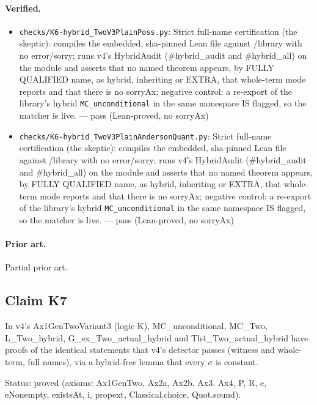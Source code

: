 \documentclass{article}
\begin{document}
\paragraph{Verified.}
\begin{itemize}
\item \texttt{checks/K6-hybrid\_TwoV3PlainPoss.py}: Strict full-name certification (the skeptic): compiles the embedded, sha-pinned Lean file against /library with no error/sorry; runs v4's HybridAudit (\#hybrid\_audit and \#hybrid\_all) on the module and asserts that no named theorem appears, by FULLY QUALIFIED name, as hybrid, inheriting or EXTRA, that whole-term mode reports and that there is no sorryAx; negative control: a re-export of the library's hybrid \texttt{MC\_unconditional} in the same namespace IS flagged, so the matcher is live. --- pass (Lean-proved, no sorryAx)
\item \texttt{checks/K6-hybrid\_TwoV3PlainAndersonQuant.py}: Strict full-name certification (the skeptic): compiles the embedded, sha-pinned Lean file against /library with no error/sorry; runs v4's HybridAudit (\#hybrid\_audit and \#hybrid\_all) on the module and asserts that no named theorem appears, by FULLY QUALIFIED name, as hybrid, inheriting or EXTRA, that whole-term mode reports and that there is no sorryAx; negative control: a re-export of the library's hybrid \texttt{MC\_unconditional} in the same namespace IS flagged, so the matcher is live. --- pass (Lean-proved, no sorryAx)
\end{itemize}

\paragraph{Prior art.} Partial prior art.

\subsection*{Claim K7}

In v4's Ax1GenTwoVariant3 (logic K), MC\_unconditional, MC\_Two, L\_Two\_hybrid, G\_ex\_Two\_actual\_hybrid and Th4\_Two\_actual\_hybrid have proofs of the identical statements that v4's detector passes (witness and whole-term, full names), via a hybrid-free lemma that every $\sigma$ is constant.

Status: proved (axioms: Ax1GenTwo, Ax2a, Ax2b, Ax3, Ax4, P, R, e, eNonempty, existsAt, i, propext, Classical.choice, Quot.sound).
\end{document}

